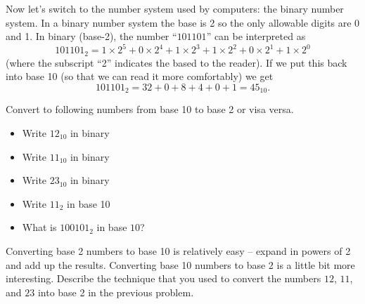 Now let's switch to the number system used by computers: the binary number system.  In a binary number system the base is 2 so the only allowable
digits are 0 and 1.  In binary (base-2), the number ``$101101$'' can be interpreted
as
\[ 101101_2 = 1 \times 2^5 + 0 \times 2^4 + 1 \times 2^3 + 1 \times 2^2 + 0 \times 2^1 + 1
\times 2^0 \]
(where the subscript ``2'' indicates the based to the reader).
If we put this back into base 10 (so that we can read it more comfortably) we get
\[ 101101_2 = 32 + 0 + 8 + 4 + 0 + 1 = 45_{10}. \] 

\begin{problem}
Convert to following numbers from base 10 to base 2 or visa versa.
    \begin{itemize}
        \item Write $12_{10}$ in binary \solution{
                \[ 12_{10} = 8+4 = 1\times 2^3 + 1 \times 2^2 + 0 \times 2^1 + 0 \times 2^0 = 1100_2\]
            }

        \item Write $11_{10}$ in binary 
        \item Write $23_{10}$ in binary
            \solution{
                \[ 23_{10} = 16 + 4 + 2 + 1 = 2^4 + 2^2 + 2^1 + 2^0 = 10111_2. \]
            }

        \item Write $11_2$ in base 10

        \item What is $100101_2$ in base $10$? \solution{
                \[ 100101_2 = 1 \times 2^0 + 0 \times 2^1 + 1 \times 2^2 + 0 \times 2^3 + 0 \times 2^4 + 1 \times 2^5 = 1 + 4 + 32 = 37 \]
            }
    \end{itemize}
\end{problem}

\begin{problem}
    Converting base 2 numbers to base 10 is relatively easy -- expand in powers of 2 and add
    up the results.  Converting base 10 numbers to base 2 is a little bit more
    interesting.  Describe the technique that you used to convert the numbers $12$, $11$,
    and $23$ into base 2 in the previous problem.  
\end{problem}


